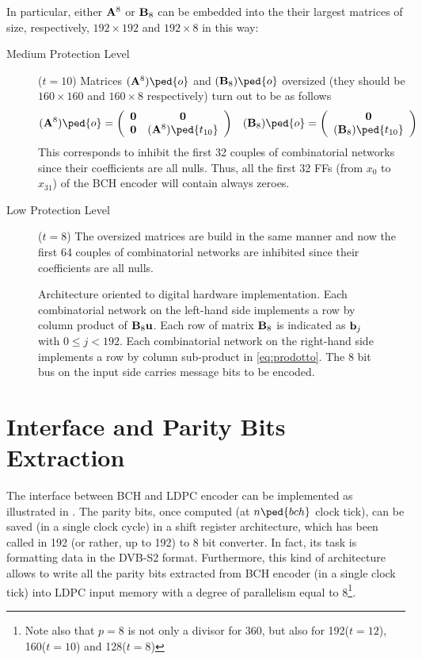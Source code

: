 In particular, either \(\mathbf{A}^8\) or \(\mathbf{B}_8\) can be embedded into the their largest matrices of size, respectively, \(192 \times 192\) and \(192 \times 8\) in this way:
\begin{description}
\item[Medium Protection Level](\(t=10\)) Matrices \((\vet A^8)\ped{o}\) and \((\vet B_8)\ped{o}\) oversized (they should be \(160 \times 160\) and \(160 \times 8\) respectively) turn out to be as follows
    \begin{align}
    (\vet A^8)\ped{o} &=
    \left(
    \begin{array}{cc}
    \vet 0 & \vet 0 \\
    \vet 0 & (\vet A^8)\ped{t_{10}}
    \end{array}
    \right) &
    (\vet B_8)\ped{o} &=
    \left(
    \begin{array}{c}
    \vet 0 \\
    (\vet B_8)\ped{t_{10}}
    \end{array}
    \right)
    \end{align} \label{eq:embedding}
    This corresponds to inhibit the first 32 couples of combinatorial networks since their coefficients are all nulls. Thus, all the first 32 FFs (from \(x_0\) to \(x_{31}\)) of the BCH encoder will contain always zeroes.
\item[Low Protection Level](\(t=8\)) The oversized matrices are build in the same manner and now the first 64 couples of combinatorial networks are inhibited since their coefficients are all nulls.
\end{description}

\begin{figure} \centering

\caption{Architecture oriented to digital hardware implementation. Each combinatorial network on the left-hand side implements a row by column product of \(\mathbf{B}_8 \mathbf{u}\). Each row of matrix \(\mathbf{B}_8\) is indicated as \(\mathbf{b}_j\) with \(0\leq j<192\). Each combinatorial network on the right-hand side implements a row by column sub-product in \eqref{eq:prodotto}. The 8 bit bus on the input side carries message bits to be encoded.} \label{fig:HWarch}
\end{figure}


\section{Interface and Parity Bits Extraction}

The interface between BCH and LDPC encoder can be implemented as illustrated in . The parity bits, once computed (at \(n\ped{bch}\) clock tick), can be saved (in a single clock cycle) in a shift register architecture, which has been called in  192 (or rather, up to 192) to 8 bit converter. In fact, its task is formatting data in the DVB-S2 format. Furthermore, this kind of architecture allows to write all the parity bits extracted from BCH encoder (in a single clock tick) into LDPC input memory with a degree of parallelism equal to 8\footnote{Note also that \(p=8\) is not only a divisor for 360, but also for 192(\(t=12\)), 160(\(t=10\)) and 128(\(t=8\))}.


